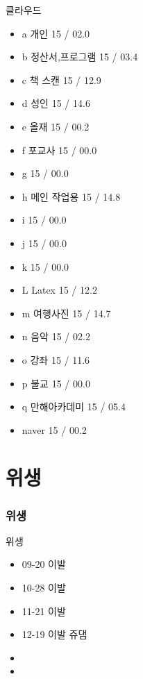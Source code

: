 \documentclass[aspectratio=1610,20pt,xcolor=pdftex,dvipsnames,table,handout]{beamer}
\begin{document}
		\begin{frame} [t,plain]
			\begin{block} {클라우드}
			\setlength{\leftmargini}{2em}			
			\begin{itemize}
				\item a 개인				\hfill 	15 / 02.0
				\item b 정산서,프로그램	\hfill 	15 / 03.4
				\item c 책 스캔			\hfill 	15 /	12.9
				\item d 성인				\hfill 	15 / 14.6
				\item e 올재				\hfill 	15 / 00.2
				\item f 포교사			\hfill 	15 / 00.0
				\item g 					\hfill 	15 / 00.0

				\item h 메인 작업용 		\hfill 	15 / 14.8
				\item i 					\hfill 	15 / 00.0
				\item j 					\hfill 	15 / 00.0
				\item k 					\hfill 	15 / 00.0

				\item L Latex 			\hfill 	15 / 12.2
				\item m 여행사진 		\hfill 	15 / 14.7
				\item n 음악 			\hfill 	15 / 02.2
				\item o 강좌				\hfill 	15 / 11.6
				\item p 불교				\hfill 	15 / 00.0
				\item q 만해아카데미		\hfill 	15 / 05.4 \\ 
				\hrulefill

				\item naver				\hfill 	15 / 00.2	
			\end{itemize}
			\end{block}						


		\end{frame}						

		\section{위생 }
		\begin{frame} [t,plain]
		\frametitle{위생 }
			\begin{block} {위생 }
			\setlength{\leftmargini}{2em}			
			\begin{itemize}
				\item 09-20 이발 
				\item 10-28 이발 
				\item 11-21 이발 
				\item 12-19 이발  쥬댐 
				\item 
				\item 
			\end{itemize}
			\end{block}						
		\end{frame}						
\end{document}
